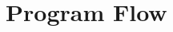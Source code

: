 \documentclass[../Maxima_Workbook.tex]{subfiles}
\begin{document}
	
\chapter{Program Flow}
\end{document}
